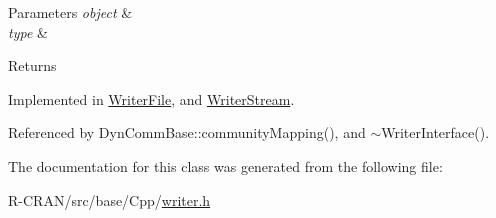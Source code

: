 \begin{DoxyParams}{Parameters}
{\em object} & \\
\hline
{\em type} & \\
\hline
\end{DoxyParams}
\begin{DoxyReturn}{Returns}

\end{DoxyReturn}


Implemented in \hyperlink{classWriterFile_ac540d18943353e011428124a5afcc393}{Writer\+File}, and \hyperlink{classWriterStream_aae19a7c01c19fe723a7a3223a53550c0}{Writer\+Stream}.



Referenced by Dyn\+Comm\+Base\+::community\+Mapping(), and $\sim$\+Writer\+Interface().



The documentation for this class was generated from the following file\+:\begin{DoxyCompactItemize}
\item 
R-\/\+C\+R\+A\+N/src/base/\+Cpp/\hyperlink{writer_8h}{writer.\+h}\end{DoxyCompactItemize}
